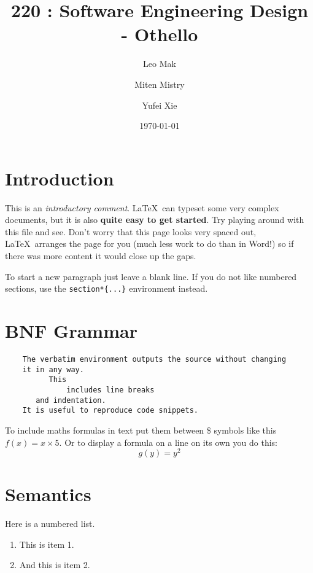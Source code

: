 \documentclass[a4wide, 11pt]{article}
\begin{document}
\title{220 : Software Engineering Design - Othello}

\author{Leo Mak \and Miten Mistry\and Yufei Xie}

\date{\today}         %

\maketitle            %

\section{Introduction}

This is an \emph{introductory comment}.
\LaTeX\ can typeset some very complex documents, but it is also
\textbf{quite easy to get started}.
Try playing around with this file and see. 
Don't worry that this page looks very spaced out,
\LaTeX\ arranges the page for you (much less work to do than in Word!)
so if there was more content it would close up the gaps.

To start a new paragraph just leave a blank line.
If you do not like numbered sections, use the \texttt{section*\{...\}}
environment instead.

\section{BNF Grammar} 

\begin{verbatim}
    The verbatim environment outputs the source without changing
    it in any way. 
          This
              includes line breaks
       and indentation. 
    It is useful to reproduce code snippets.
\end{verbatim}

To include maths formulas in text put them between \$ symbols like this
$f(x) = x \times 5$.
Or to display a formula on a line on its own you do this:
\[
    g(y) = y^2
\]

\section{Semantics}

Here is a numbered list.

\begin{enumerate}

    \item
    This is item 1.
    
    \item
    And this is item 2.
    
\end{enumerate}
\end{document}
